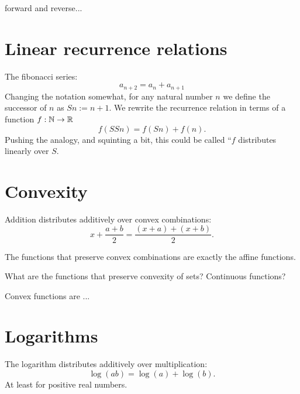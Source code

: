 \documentclass[11pt]{article}
\begin{document}
forward and reverse...
\cite{Colah2015}

\cite{Griewank2012}


%

%
%

\section{Linear recurrence relations}

The fibonacci series:
$$
    a_{n+2} = a_n + a_{n+1}
$$
Changing the notation somewhat, for any natural number $n$
we define the successor of $n$ as $Sn := n+1.$
We rewrite the recurrence relation in terms of a function $f:\mathbb N\to\mathbb R$
$$
    f(SSn) = f(Sn) + f(n).
$$
Pushing the analogy, and squinting a bit, this
could be called ``$f$ distributes linearly over $S.$

%
%

\section{Convexity}

Addition distributes additively over convex
combinations:
$$
x + \frac{a+b}{2} = \frac{(x+a) + (x+b)}{2}.
$$

The functions that preserve convex combinations
are exactly the affine functions.

What are the functions that preserve convexity of sets? Continuous functions?

Convex functions are ...

%
%

\section{Logarithms}

The logarithm distributes additively over multiplication: 
$$\log(ab) = \log(a) + \log(b).$$
At least for positive real numbers.
\end{document}
